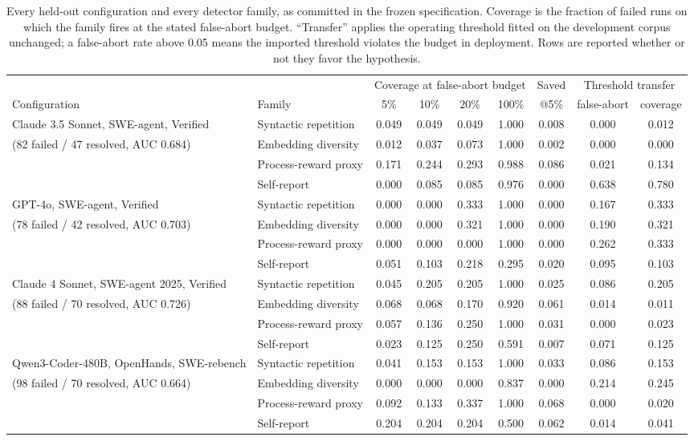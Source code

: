 \documentclass[sigconf,screen]{acmart}
\begin{document}
\begin{table}[t]
\centering
\small
\caption{Every held-out configuration and every detector family, as committed in the frozen
specification. Coverage is the fraction of failed runs on which the family fires at the stated
false-abort budget. ``Transfer'' applies the operating threshold fitted on the development corpus
unchanged; a false-abort rate above 0.05 means the imported threshold violates the budget in
deployment. Rows are reported whether or not they favor the hypothesis.}
\begin{tabular}{llccccccc}
\toprule
& & \multicolumn{4}{c}{Coverage at false-abort budget} & Saved & \multicolumn{2}{c}{Threshold transfer} \\
\cmidrule(lr){3-6}\cmidrule(lr){8-9}
Configuration & Family & 5\% & 10\% & 20\% & 100\% & @5\% & false-abort & coverage \\
\midrule
Claude 3.5 Sonnet, SWE-agent, Verified & Syntactic repetition & 0.049 & 0.049 & 0.049 & 1.000 & 0.008 & 0.000 & 0.012 \\
(82 failed / 47 resolved, AUC 0.684) & Embedding diversity & 0.012 & 0.037 & 0.073 & 1.000 & 0.002 & 0.000 & 0.000 \\
 & Process-reward proxy & 0.171 & 0.244 & 0.293 & 0.988 & 0.086 & 0.021 & 0.134 \\
 & Self-report & 0.000 & 0.085 & 0.085 & 0.976 & 0.000 & 0.638 & 0.780 \\
\midrule
GPT-4o, SWE-agent, Verified & Syntactic repetition & 0.000 & 0.000 & 0.333 & 1.000 & 0.000 & 0.167 & 0.333 \\
(78 failed / 42 resolved, AUC 0.703) & Embedding diversity & 0.000 & 0.000 & 0.321 & 1.000 & 0.000 & 0.190 & 0.321 \\
 & Process-reward proxy & 0.000 & 0.000 & 0.000 & 1.000 & 0.000 & 0.262 & 0.333 \\
 & Self-report & 0.051 & 0.103 & 0.218 & 0.295 & 0.020 & 0.095 & 0.103 \\
\midrule
Claude 4 Sonnet, SWE-agent 2025, Verified & Syntactic repetition & 0.045 & 0.205 & 0.205 & 1.000 & 0.025 & 0.086 & 0.205 \\
(88 failed / 70 resolved, AUC 0.726) & Embedding diversity & 0.068 & 0.068 & 0.170 & 0.920 & 0.061 & 0.014 & 0.011 \\
 & Process-reward proxy & 0.057 & 0.136 & 0.250 & 1.000 & 0.031 & 0.000 & 0.023 \\
 & Self-report & 0.023 & 0.125 & 0.250 & 0.591 & 0.007 & 0.071 & 0.125 \\
\midrule
Qwen3-Coder-480B, OpenHands, SWE-rebench & Syntactic repetition & 0.041 & 0.153 & 0.153 & 1.000 & 0.033 & 0.086 & 0.153 \\
(98 failed / 70 resolved, AUC 0.664) & Embedding diversity & 0.000 & 0.000 & 0.000 & 0.837 & 0.000 & 0.214 & 0.245 \\
 & Process-reward proxy & 0.092 & 0.133 & 0.337 & 1.000 & 0.068 & 0.000 & 0.020 \\
 & Self-report & 0.204 & 0.204 & 0.204 & 0.500 & 0.062 & 0.014 & 0.041 \\
\bottomrule
\end{tabular}
\label{tab:transfer}
\end{table}
\end{document}
